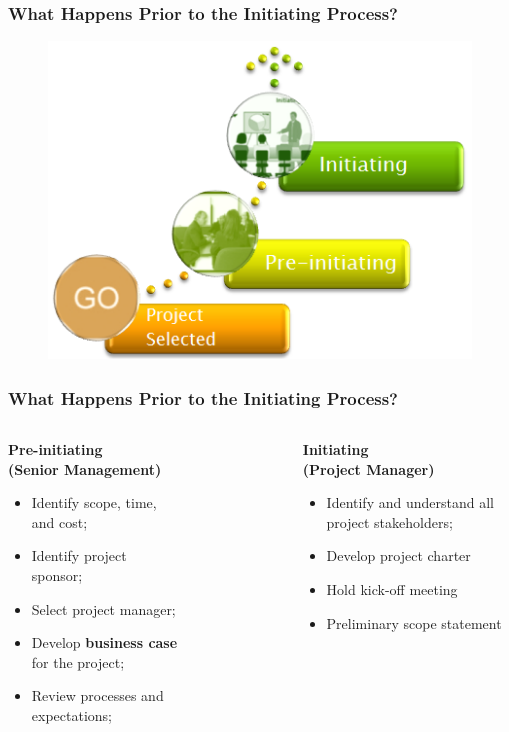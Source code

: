 \documentclass[aspectratio=169]{beamer}
\begin{document}
\begin{frame}
\frametitle{What Happens Prior to the Initiating Process?}
\begin{figure}
\includegraphics[scale=0.8]{init}
\end{figure}
\end{frame}

\begin{frame}
\frametitle{What Happens Prior to the Initiating Process?}
\begin{columns}
\begin{tcolorbox}
\textbf{Pre-initiating}\\
\textbf{(Senior Management)}
\begin{itemize}
\item Identify scope, time, and cost;
\item Identify project sponsor;
\item Select project manager;
\item Develop \textbf{business case} for the project;
\item Review processes and expectations;
\end{itemize}
\end{tcolorbox}
\begin{figure}
\end{figure}
\begin{tcolorbox}
\textbf{Initiating}\\
\textbf{(Project Manager)}
\begin{itemize}
\item Identify and understand all project stakeholders;
\item Develop project charter
\item Hold kick-off meeting
\item Preliminary scope statement
\end{itemize}
\end{tcolorbox}
\end{columns}
\end{frame}
\end{document}

